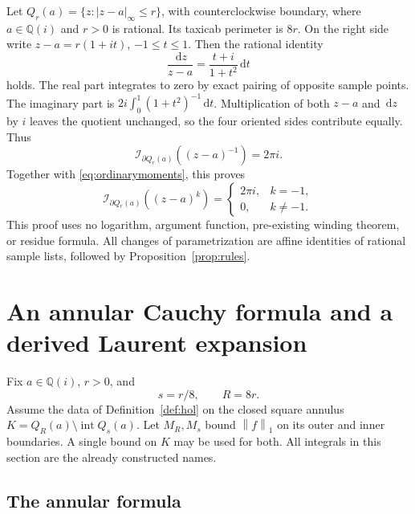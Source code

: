 \documentclass[11pt]{article}
\theoremstyle{definition}
\newcommand{\Q}{\mathbb Q}
\newcommand{\norm}[1]{\left\lVert#1\right\rVert_1}
\newcommand{\dd}{\,\mathrm d}
\newcommand{\Int}{\mathcal I}
\newcommand{\bd}{\partial}
\begin{document}
Let \(Q_r(a)=\{z:|z-a|_\infty\le r\}\), with counterclockwise boundary,
where \(a\in\Q(i)\) and \(r>0\) is rational. Its taxicab perimeter is
\(8r\). On the right side write \(z-a=r(1+it)\), \(-1\le t\le1\).
Then the rational identity
\[
 \frac{\dd z}{z-a}=\frac{t+i}{1+t^2}\dd t
\]
holds. The real part integrates to zero by exact pairing of opposite
sample points. The imaginary part is
\(2i\int_0^1(1+t^2)^{-1}\dd t\).
Multiplication of both \(z-a\) and \(\dd z\) by \(i\) leaves the quotient
unchanged, so the four oriented sides contribute equally. Thus
\begin{equation}\label{eq:kernelmoment}
 \Int_{\bd Q_r(a)}((z-a)^{-1})=2\pi i.
\end{equation}
Together with \eqref{eq:ordinarymoments}, this proves
\begin{equation}\label{eq:allmoments}
 \boxed{\quad
 \Int_{\bd Q_r(a)}((z-a)^k)=
 \begin{cases}2\pi i,&k=-1,\\0,&k\ne-1.\end{cases}
 \quad}
\end{equation}
This proof uses no logarithm, argument function, pre-existing winding
theorem, or residue formula. All changes of parametrization are affine
identities of rational sample lists, followed by
Proposition~\ref{prop:rules}.

\section{An annular Cauchy formula and a derived Laurent expansion}\label{sec:laurent}

Fix \(a\in\Q(i)\), \(r>0\), and
\begin{equation}\label{eq:radii}
 s=r/8,\qquad R=8r.
\end{equation}
Assume the data of Definition~\ref{def:hol} on the closed square annulus
\(K=Q_R(a)\setminus\operatorname{int}Q_s(a)\).
Let \(M_R,M_s\) bound \(\norm f\) on its outer and inner boundaries.
A single bound on \(K\) may be used for both. All integrals in this
section are the already constructed names.

\subsection{The annular formula}
\end{document}

